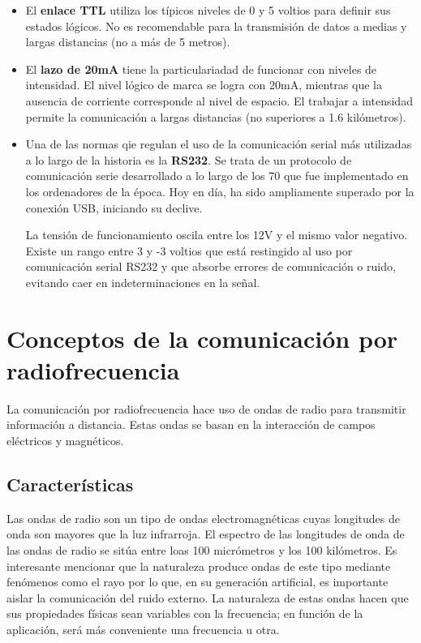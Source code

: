 \begin{itemize}
\item El \textbf{enlace TTL} utiliza los típicos niveles de 0 y 5 voltios para definir sus estados lógicos. No es recomendable para la transmisión de datos a medias y largas distancias (no a más de 5 metros).

\item El \textbf{lazo de 20mA} tiene la particulariadad de funcionar con niveles de intensidad. El nivel lógico de marca se logra con 20mA, mientras que la ausencia de corriente corresponde al nivel de espacio. El trabajar a intensidad permite la comunicación a largas distancias (no superiores a 1.6 kilómetros).

\item Una de las normas qie regulan el uso de la comunicación serial más utilizadas a lo largo de la historia es la \textbf{RS232}. Se trata de un protocolo de comunicación serie desarrollado a lo largo de los 70 que fue implementado en los ordenadores de la época. Hoy en día, ha sido ampliamente superado por la conexión USB, iniciando su declive.

La tensión de funcionamiento oscila entre los 12V y el mismo valor negativo. Existe un rango entre 3 y -3 voltios que está restingido al uso por comunicación serial RS232 y que absorbe errores de comunicación o ruido, evitando caer en indeterminaciones en la señal.
\end{itemize}

\section{Conceptos de la comunicación por radiofrecuencia}

La comunicación por radiofrecuencia hace uso de ondas de radio para transmitir información a distancia. Estas ondas se basan en la interacción de campos eléctricos y magnéticos.

\subsection{Características}

Las ondas de radio son un tipo de ondas electromagnéticas cuyas longitudes de onda son mayores que la luz infrarroja. El espectro de las longitudes de onda de las ondas de radio se sitúa entre loas 100 micrómetros y los 100 kilómetros. Es interesante mencionar que la naturaleza produce ondas de este tipo mediante fenómenos como el rayo por lo que, en su generación artificial, es importante aislar la comunicación del ruido externo. La naturaleza de estas ondas hacen que sus propiedades físicas sean variables con la frecuencia; en función de la aplicación, será más conveniente una frecuencia u otra.


